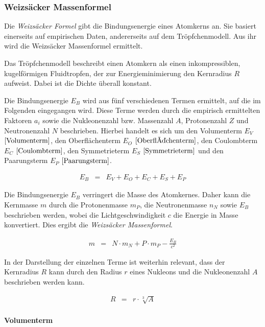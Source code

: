 \documentclass[12pt,a4paper]{scrartcl}
\numberwithin{equation}{section} %
\begin{document}
\hypertarget{weizsuxe4cker-massenformel}{%
\subsubsection{Weizsäcker
Massenformel}\label{weizsuxe4cker-massenformel}}

Die \emph{Weizsäcker Formel} gibt die Bindungsenergie eines Atomkerns an. Sie basiert einerseits auf empirischen Daten, andererseits auf dem Tröpfchenmodell. Aus ihr wird die Weizsäcker Massenformel ermittelt.

Das Tröpfchenmodell beschreibt einen Atomkern als einen inkompressiblen, kugelförmigen Fluidtropfen, der zur Energieminimierung den Kernradius $R$ aufweist. Dabei ist die Dichte überall konstant.

Die Bindungsenergie $E_B$ wird aus fünf verschiedenen Termen ermittelt, auf die im Folgenden eingegangen wird. Diese Terme werden durch die empirisch ermittelten Faktoren $a_i$ sowie die Nukleonenzahl bzw. Massenzahl $A$, Protonenzahl $Z$ und Neutronenzahl $N$ beschrieben. Hierbei handelt es sich um den Volumenterm $E_V$ $\eqref{Volumenterm}$, den Oberflächenterm $E_O$ $\eqref{Oberflächenterm}$, den Coulombterm $E_C$ $\eqref{Coulombterm}$, den Symmetrieterm $E_S$ $\eqref{Symmetrieterm}$ und den Paarungsterm $E_P$ $\eqref{Paarungsterm}$.

\begin{eqnarray}
    E_B &=& E_V + E_O + E_C + E_S + E_P
\end{eqnarray}

Die Bindungsenergie $E_B$ verringert die Masse des Atomkernes. Daher kann die Kernmasse $m$ durch die Protonenmasse $m_P$, die Neutronenmasse $n_N$ sowie $E_B$ beschrieben werden, wobei die Lichtgeschwindigkeit $c$ die Energie in Masse konvertiert. Dies ergibt die \emph{Weizsäcker Massenformel}.

\begin{eqnarray}
    m &=& N\cdot m_N + P\cdot m_P - \frac{E_B}{c^2}
\end{eqnarray}

In der Darstellung der einzelnen Terme ist weiterhin relevant, dass der Kernradius $R$ kann durch den Radius $r$ eines Nukleons und die Nukleonenzahl $A$ beschrieben werden kann.

\begin{eqnarray}
    R &=& r \cdot \sqrt[3]{A}
\end{eqnarray}

\hypertarget{volumenterm}{%
\paragraph{Volumenterm}\label{volumenterm}}
\end{document}
